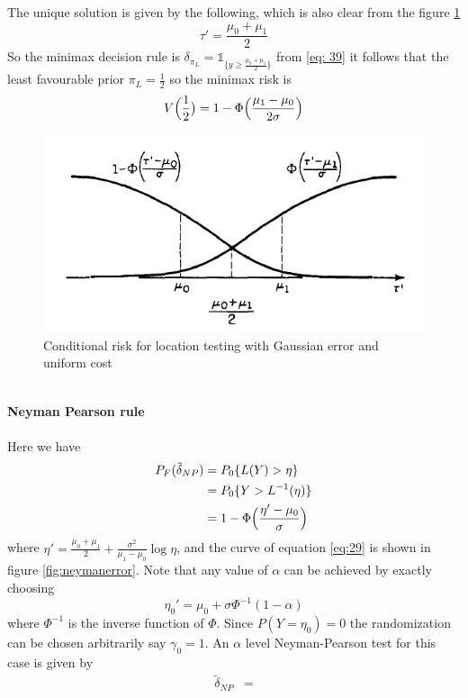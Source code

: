 \documentclass[a4paper,english,12pt]{article}
\begin{document}
\begin{exmp}
\begin{equation}
\end{equation}
The unique solution is given by the following, which is also clear from the figure \ref{fig:minimaxerror}
\begin{equation}
\tau'=\frac{\mu_{0}+\mu_{1}}{2}\label{eq: 39}
\end{equation}
So the minimax decision rule is $\delta_{\pi_L}=\mathds{1}_{\{ y\geq\frac{\mu_{0}+\mu_{1}}{2}\}}$
from \ref{eq: 39} it follows that the least favourable prior $\pi_L=\frac{1}{2}$ so the minimax risk is
\begin{equation}
V\Bigl(\frac{1}{2}\bigr)=1-\Phi\Bigl(\frac{\mu_1-\mu_0}{2\sigma}\Bigr)
\end{equation}
\begin{figure}[h]
\centering
\includegraphics[width=0.6\linewidth]{Figures/Gauss_Minimax}
\caption{Conditional risk for location testing with Gaussian error and uniform cost}
\label{fig:minimaxerror}
\end{figure}\\
\textbf{Neyman Pearson rule}\\\\
Here we have
\begin{align}
P_F(\tilde{\delta}_{NP})&=P_0\{L(Y)>\eta\}\nonumber\\
					  &=P_0\{Y>L^{-1}(\eta)\}\nonumber\\
					  &=1-\Phi\Bigl(\frac{\eta'-\mu_0}{\sigma}\Bigr)\label{eq:29}
\end{align}
 where $\eta'=\frac{\mu_{0}+\mu_{1}}{2}+\frac{\sigma^2}{\mu_1-\mu_0}\log\eta$, and the curve of equation \ref{eq:29} is shown in figure \ref{fig:neymanerror}. Note that any value of $\alpha$ can be achieved by exactly choosing
\begin{equation}
\eta_0'=\mu_{0}+\sigma\Phi^{-1}(1-\alpha)
\end{equation}
where $\Phi^{-1}$ is the inverse function of $\Phi$. Since $P(Y=\eta_0)=0$ the randomization can be chosen arbitrarily say $\gamma_0=1$. An $\alpha$ level Neyman-Pearson test for this case is given by
\begin{align}
\tilde{\delta}_{NP}&=

\end{align}
\end{exmp}
\end{document}
